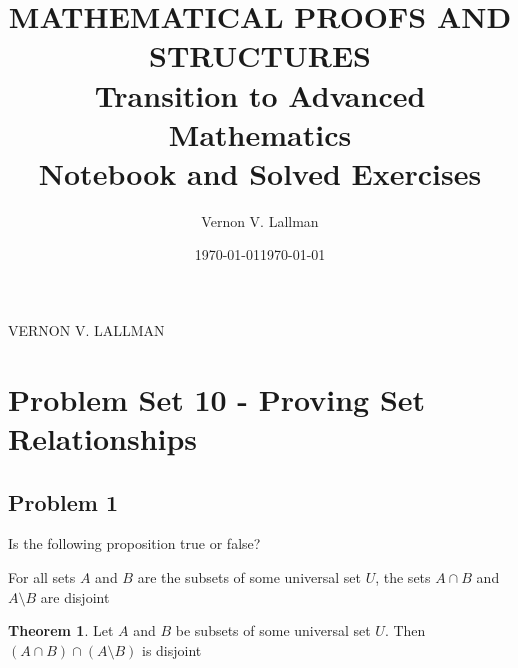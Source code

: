\documentclass{book}
\title{\textsc{MATHEMATICAL PROOFS AND STRUCTURES}\\ {\bf Transition to Advanced Mathematics}\\ Notebook and Solved Exercises}
\author{Vernon V. Lallman}
\date{\today}
\theoremstyle{definition}
\newtheorem{theorem}{Theorem}[section]
\begin{document}
 \maketitle

\tableofcontents





\newpage
VERNON V. LALLMAN
\section{Problem Set 10 - Proving Set Relationships}
\date{\today}

\subsection{Problem 1}
Is the following proposition true or false? 
    \begin{center}
        For all sets $A$ and $B$ are the subsets of some universal set $U$, the sets $A \cap B$ and $A \setminus B$ are disjoint
    \end{center}

\begin{tcolorbox}
	\begin{theorem}
		Let $A$ and $B$ be subsets of some universal set $U$. Then $(A \cap B) \cap (A \setminus B)$ is disjoint 
	\end{theorem}
\end{tcolorbox}
\end{document}
